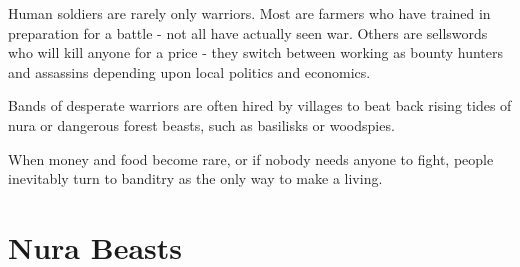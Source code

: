 \begin{multicols}{2}
Human soldiers are rarely only warriors.  Most are farmers who have trained in preparation for a battle - not all have actually seen war.  Others are sellswords who will kill anyone for a price - they switch between working as bounty hunters and assassins depending upon local politics and economics.

Bands of desperate warriors are often hired by villages to beat back rising tides of nura or dangerous forest beasts, such as basilisks or woodspies.

When money and food become rare, or if nobody needs anyone to fight, people inevitably turn to banditry as the only way to make a living.

\humansoldier

\vfill\null
\end{multicols}

\section{Nura Beasts}

